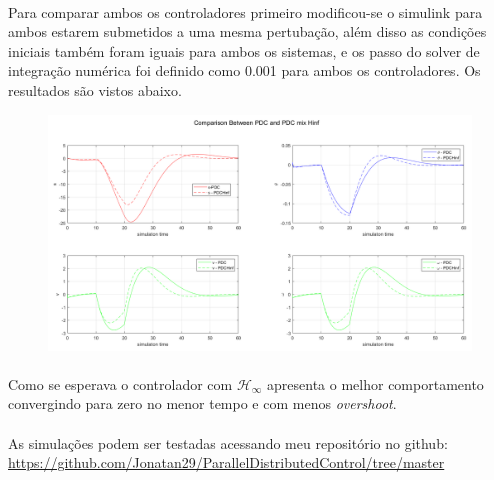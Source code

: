 \documentclass[a4paper,10pt]{article}
\begin{document}
\paragraph{}Para comparar ambos os controladores primeiro modificou-se o simulink para ambos estarem submetidos a uma mesma pertubação, além disso as condições iniciais também foram iguais para ambos os sistemas, e os passo do solver de integração numérica foi definido como 0.001 para ambos os controladores. Os resultados são vistos abaixo.
\begin{figure}[H]
	\centering
	\includegraphics[scale = 0.5]{fig/PDCHinfcompare}
\end{figure}

\paragraph{}Como se esperava o controlador com $\mathcal{H}_{\infty}$ apresenta o melhor comportamento convergindo para zero no menor tempo e com menos \textit{overshoot}.
\paragraph{}As simulações podem ser testadas acessando meu repositório no github: \url{https://github.com/Jonatan29/ParallelDistributedControl/tree/master}
\end{document}
